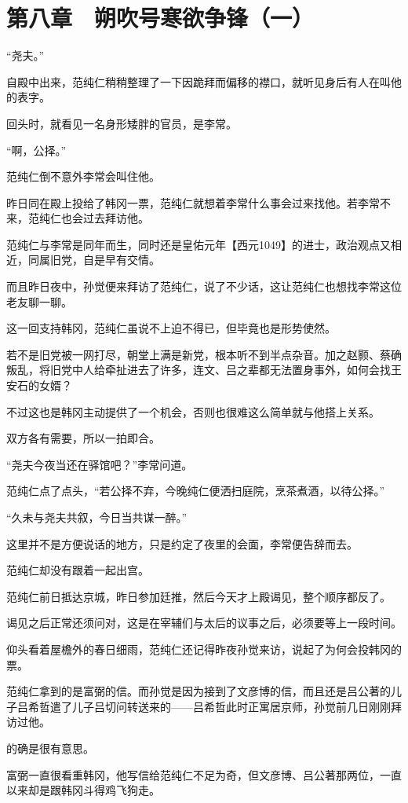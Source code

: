 \section{第八章　朔吹号寒欲争锋（一）}

“尧夫。”

自殿中出来，范纯仁稍稍整理了一下因跪拜而偏移的襟口，就听见身后有人在叫他的表字。

回头时，就看见一名身形矮胖的官员，是李常。

“啊，公择。”

范纯仁倒不意外李常会叫住他。

昨日同在殿上投给了韩冈一票，范纯仁就想着李常什么事会过来找他。若李常不来，范纯仁也会过去拜访他。

范纯仁与李常是同年而生，同时还是皇佑元年【西元1049】的进士，政治观点又相近，同属旧党，自是早有交情。

而且昨日夜中，孙觉便来拜访了范纯仁，说了不少话，这让范纯仁也想找李常这位老友聊一聊。

这一回支持韩冈，范纯仁虽说不上迫不得已，但毕竟也是形势使然。

若不是旧党被一网打尽，朝堂上满是新党，根本听不到半点杂音。加之赵颢、蔡确叛乱，将旧党中人给牵扯进去了许多，连文、吕之辈都无法置身事外，如何会找王安石的女婿？

不过这也是韩冈主动提供了一个机会，否则也很难这么简单就与他搭上关系。

双方各有需要，所以一拍即合。

“尧夫今夜当还在驿馆吧？”李常问道。

范纯仁点了点头，“若公择不弃，今晚纯仁便洒扫庭院，烹茶煮酒，以待公择。”

“久未与尧夫共叙，今日当共谋一醉。”

这里并不是方便说话的地方，只是约定了夜里的会面，李常便告辞而去。

范纯仁却没有跟着一起出宫。

范纯仁前日抵达京城，昨日参加廷推，然后今天才上殿谒见，整个顺序都反了。

谒见之后正常还须问对，这是在宰辅们与太后的议事之后，必须要等上一段时间。

仰头看着屋檐外的春日细雨，范纯仁还记得昨夜孙觉来访，说起了为何会投韩冈的票。

范纯仁拿到的是富弼的信。而孙觉是因为接到了文彦博的信，而且还是吕公著的儿子吕希哲遣了儿子吕切问转送来的——吕希哲此时正寓居京师，孙觉前几日刚刚拜访过他。

的确是很有意思。

富弼一直很看重韩冈，他写信给范纯仁不足为奇，但文彦博、吕公著那两位，一直以来却是跟韩冈斗得鸡飞狗走。

